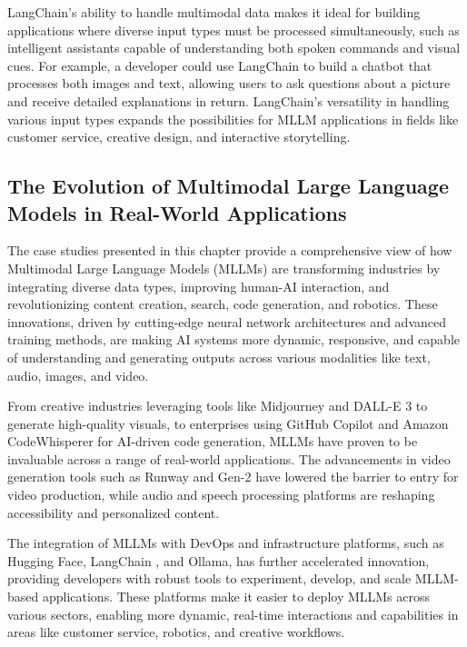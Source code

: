 LangChain's ability to handle multimodal data makes it ideal for building applications where diverse input types must be processed simultaneously, such as intelligent assistants capable of understanding both spoken commands and visual cues. 
For example, a developer could use LangChain to build a chatbot that processes both images and text, allowing users to ask questions about a picture and receive detailed explanations in return. 
LangChain's versatility in handling various input types expands the possibilities for MLLM applications in fields like customer service, creative design, and interactive storytelling.


\subsection{The Evolution of Multimodal Large Language Models in Real-World Applications}
The case studies presented in this chapter provide a comprehensive view of how Multimodal Large Language Models (MLLMs) are transforming industries by integrating diverse data types, improving human-AI interaction, and revolutionizing content creation, search, code generation, and robotics. These innovations, driven by cutting-edge neural network architectures and advanced training methods, are making AI systems more dynamic, responsive, and capable of understanding and generating outputs across various modalities like text, audio, images, and video.

From creative industries leveraging tools like Midjourney \cite{Midjourney} and DALL-E 3 \cite{DALLE3} to generate high-quality visuals, to enterprises using GitHub Copilot \cite{GitHubCopilot} and Amazon CodeWhisperer \cite{AmazonCodeWhisperer} for AI-driven code generation, MLLMs have proven to be invaluable across a range of real-world applications. The advancements in video generation tools such as Runway \cite{ha2022runway} and Gen-2 \cite{esser2023gen2} have lowered the barrier to entry for video production, while audio and speech processing platforms are reshaping accessibility and personalized content.

The integration of MLLMs with DevOps and infrastructure platforms, such as Hugging Face, LangChain \cite{chase2022langchain}, and Ollama, has further accelerated innovation, providing developers with robust tools to experiment, develop, and scale MLLM-based applications. These platforms make it easier to deploy MLLMs across various sectors, enabling more dynamic, real-time interactions and capabilities in areas like customer service, robotics, and creative workflows.

